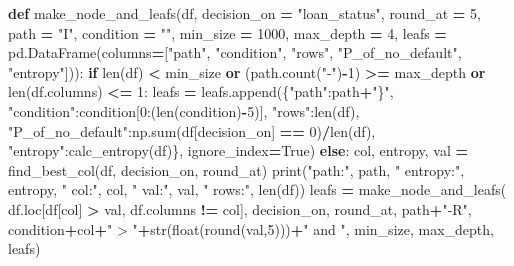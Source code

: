 \documentclass[
]{book}
\newenvironment{Shaded}{\begin{snugshade}}{\end{snugshade}}
\newcommand{\BuiltInTok}[1]{#1}
\newcommand{\ControlFlowTok}[1]{\textcolor[rgb]{0.13,0.29,0.53}{\textbf{#1}}}
\newcommand{\DecValTok}[1]{\textcolor[rgb]{0.00,0.00,0.81}{#1}}
\newcommand{\KeywordTok}[1]{\textcolor[rgb]{0.13,0.29,0.53}{\textbf{#1}}}
\newcommand{\NormalTok}[1]{#1}
\newcommand{\OperatorTok}[1]{\textcolor[rgb]{0.81,0.36,0.00}{\textbf{#1}}}
\newcommand{\StringTok}[1]{\textcolor[rgb]{0.31,0.60,0.02}{#1}}
\newcommand{\VariableTok}[1]{\textcolor[rgb]{0.00,0.00,0.00}{#1}}
\begin{document}
\begin{Shaded}
\begin{Highlighting}[]
\KeywordTok{def}\NormalTok{ make\_node\_and\_leafs(df, decision\_on }\OperatorTok{=} \StringTok{"loan\_status"}\NormalTok{, round\_at }\OperatorTok{=} \DecValTok{5}\NormalTok{, path }\OperatorTok{=} \StringTok{"I"}\NormalTok{, condition }\OperatorTok{=} \StringTok{""}\NormalTok{, min\_size }\OperatorTok{=} \DecValTok{1000}\NormalTok{, max\_depth }\OperatorTok{=} \DecValTok{4}\NormalTok{, leafs }\OperatorTok{=}\NormalTok{ pd.DataFrame(columns}\OperatorTok{=}\NormalTok{[}\StringTok{"path"}\NormalTok{, }\StringTok{"condition"}\NormalTok{, }\StringTok{"rows"}\NormalTok{, }\StringTok{"P\_of\_no\_default"}\NormalTok{, }\StringTok{"entropy"}\NormalTok{])):}
  \ControlFlowTok{if} \BuiltInTok{len}\NormalTok{(df) }\OperatorTok{\textless{}}\NormalTok{ min\_size }\KeywordTok{or}\NormalTok{ (path.count(}\StringTok{"{-}"}\NormalTok{)}\OperatorTok{{-}}\DecValTok{1}\NormalTok{) }\OperatorTok{\textgreater{}=}\NormalTok{ max\_depth }\KeywordTok{or} \BuiltInTok{len}\NormalTok{(df.columns) }\OperatorTok{\textless{}=} \DecValTok{1}\NormalTok{:}
\NormalTok{    leafs }\OperatorTok{=}\NormalTok{ leafs.append(\{}\StringTok{"path"}\NormalTok{:path}\OperatorTok{+}\StringTok{"\}"}\NormalTok{, }\StringTok{"condition"}\NormalTok{:condition[}\DecValTok{0}\NormalTok{:(}\BuiltInTok{len}\NormalTok{(condition)}\OperatorTok{{-}}\DecValTok{5}\NormalTok{)], }\StringTok{"rows"}\NormalTok{:}\BuiltInTok{len}\NormalTok{(df), }\StringTok{"P\_of\_no\_default"}\NormalTok{:np.}\BuiltInTok{sum}\NormalTok{(df[decision\_on] }\OperatorTok{==} \DecValTok{0}\NormalTok{)}\OperatorTok{/}\BuiltInTok{len}\NormalTok{(df), }\StringTok{"entropy"}\NormalTok{:calc\_entropy(df)\}, ignore\_index}\OperatorTok{=}\VariableTok{True}\NormalTok{)}
  \ControlFlowTok{else}\NormalTok{:}
\NormalTok{    col, entropy, val }\OperatorTok{=}\NormalTok{ find\_best\_col(df, decision\_on, round\_at)}
    \BuiltInTok{print}\NormalTok{(}\StringTok{"path:"}\NormalTok{, path, }\StringTok{"   entropy:"}\NormalTok{, entropy, }\StringTok{"  col:"}\NormalTok{, col, }\StringTok{"   val:"}\NormalTok{, val, }\StringTok{"  rows:"}\NormalTok{, }\BuiltInTok{len}\NormalTok{(df))}
\NormalTok{    leafs }\OperatorTok{=}\NormalTok{ make\_node\_and\_leafs( df.loc[df[col] }\OperatorTok{\textgreater{}}\NormalTok{ val, df.columns }\OperatorTok{!=}\NormalTok{ col], decision\_on, round\_at, path}\OperatorTok{+}\StringTok{"{-}R"}\NormalTok{, condition}\OperatorTok{+}\NormalTok{col}\OperatorTok{+}\StringTok{" \textgreater{} "}\OperatorTok{+}\BuiltInTok{str}\NormalTok{(}\BuiltInTok{float}\NormalTok{(}\BuiltInTok{round}\NormalTok{(val,}\DecValTok{5}\NormalTok{)))}\OperatorTok{+}\StringTok{" and "}\NormalTok{, min\_size, max\_depth, leafs)}

\end{Highlighting}
\end{Shaded}
\end{document}
